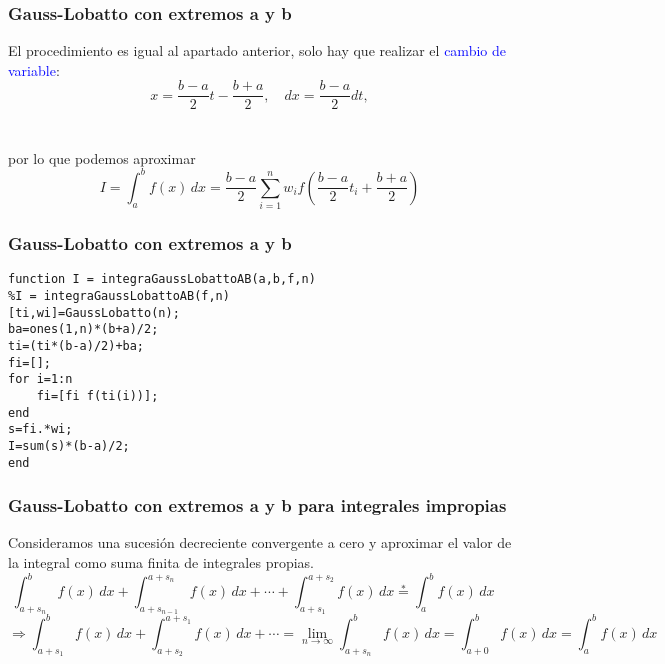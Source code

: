 \documentclass{beamer}
\begin{document}
\begin{frame}
\frametitle{Gauss-Lobatto con extremos a y b}
El procedimiento es igual al apartado anterior, solo hay que realizar el \textcolor{blue}{cambio de variable}:
\[x=\frac{b-a}{2}t-\frac{b+a}{2},\quad dx=\frac{b-a}{2}dt,\]
\\~\\
por lo que podemos aproximar
\[\displaystyle I=\int_{a}^{b} \! f(x)  \,dx = \frac{b-a}{2} \sum_{i=1}^{n}w_i f \left(\frac{b-a}{2}t_i + \frac{b+a}{2} \right)\]
\end{frame}


\begin{frame}[fragile] %
\frametitle{Gauss-Lobatto con extremos a y b}
\begin{example}
\begin{verbatim}
function I = integraGaussLobattoAB(a,b,f,n)
%I = integraGaussLobattoAB(f,n)
[ti,wi]=GaussLobatto(n);
ba=ones(1,n)*(b+a)/2;
ti=(ti*(b-a)/2)+ba;
fi=[];
for i=1:n
    fi=[fi f(ti(i))];
end
s=fi.*wi;
I=sum(s)*(b-a)/2;
end\end{verbatim}
\end{example}
\end{frame}



\begin{frame}
\frametitle{Gauss-Lobatto con extremos a y b para integrales impropias}
Consideramos una sucesión decreciente convergente a cero
y aproximar el valor de la integral como suma finita de integrales propias.
$$
\int_{a + s_n}^b f(x) \, dx + \int_{a + s_{n-1}}^{a + s_n} f(x) \, dx + \cdots + \int_{a + s_1}^{a + s_2} f(x) \, dx \stackrel{*}= \int_a^b f(x) \, dx \quad $$
$$\Rightarrow \int_{a + s_1}^b f(x) \, dx + \int_{a + s_2}^{a + s_1} f(x) \, dx + \cdots = \lim_{n \rightarrow \infty} \int_{a + s_n}^b f(x) \, dx = \int_{a + 0}^b f(x) \, dx = \int_a^b f(x) \, dx$$
\\~\\
\end{frame}
\end{document}
